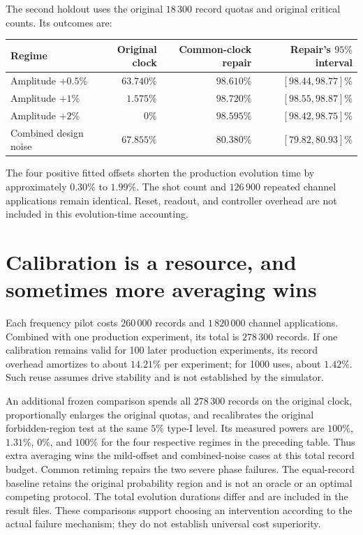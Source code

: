 The second holdout uses the original $18\,300$ record quotas and original
critical counts. Its outcomes are:
\begin{center}
\begin{tabular}{lrrr}
Regime & Original clock & Common-clock repair & Repair's $95\%$ interval\\
\hline
Amplitude $+0.5\%$ & $63.740\%$ & $98.610\%$ & $[98.44,98.77]\%$\\
Amplitude $+1\%$ & $1.575\%$ & $98.720\%$ & $[98.55,98.87]\%$\\
Amplitude $+2\%$ & $0\%$ & $98.595\%$ & $[98.42,98.75]\%$\\
Combined design noise & $67.855\%$ & $80.380\%$ & $[79.82,80.93]\%$
\end{tabular}
\end{center}
The four positive fitted offsets shorten the production evolution time by
approximately $0.30\%$ to $1.99\%$. The shot count and $126\,900$ repeated
channel applications remain identical. Reset, readout, and controller overhead
are not included in this evolution-time accounting.

\section{Calibration is a resource, and sometimes more averaging wins}
Each frequency pilot costs $260\,000$ records and $1\,820\,000$ channel
applications. Combined with one production experiment, its total is
$278\,300$ records. If one calibration remains valid for 100 later production
experiments, its record overhead amortizes to about $14.21\%$ per experiment;
for 1000 uses, about $1.42\%$. Such reuse assumes drive stability and is not
established by the simulator.

An additional frozen comparison spends all $278\,300$ records on the original
clock, proportionally enlarges the original quotas, and recalibrates the
original forbidden-region test at the same $5\%$ type-I level. Its measured
powers are $100\%$, $1.31\%$, $0\%$, and $100\%$ for the four respective
regimes in the preceding table. Thus extra averaging wins the mild-offset and
combined-noise cases at this total record budget. Common retiming repairs the
two severe phase failures. The equal-record baseline retains the original
probability region and is not an oracle or an optimal competing protocol.
The total evolution durations differ and are included in the result files.
These comparisons support choosing an intervention according to the actual
failure mechanism; they do not establish universal cost superiority.

